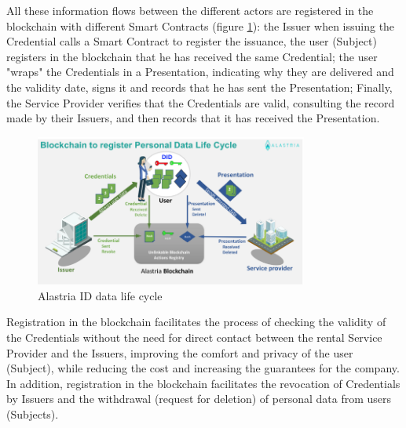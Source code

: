 All these information flows between the different actors are registered in the blockchain with different Smart Contracts (figure \ref{fig:rent-cycle}): the Issuer when issuing the Credential calls a Smart Contract to register the issuance, the user (Subject) registers in the blockchain that he has received the same Credential; the user "wraps" the Credentials in a Presentation, indicating why they are delivered and the validity date, signs it and records that he has sent the Presentation; Finally, the Service Provider verifies that the Credentials are valid, consulting the record made by their Issuers, and then records that it has received the Presentation.
\begin{figure}[h]
    \centering
    \includegraphics[width=0.8\textwidth]{images/Alastria ID/rent-car-data-lifecycle.png}
    \caption{Alastria ID data life cycle}
    \label{fig:rent-cycle}
\end{figure}

Registration in the blockchain facilitates the process of checking the validity of the Credentials without the need for direct contact between the rental Service Provider and the Issuers, improving the comfort and privacy of the user (Subject), while reducing the cost and increasing the guarantees for the company.\\

In addition, registration in the blockchain facilitates the revocation of Credentials by Issuers and the withdrawal (request for deletion) of personal data from users (Subjects).
